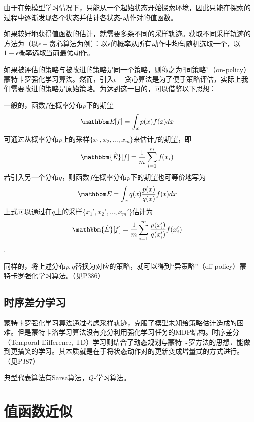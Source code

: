 由于在免模型学习情况下，只能从一个起始状态开始探索环境，因此只能在探索的过程中逐渐发现各个状态并估计各状态-动作对的值函数。

如果较好地获得值函数的估计，就需要多条不同的采样轨迹。获取不同采样轨迹的方法为（以$\epsilon-$贪心算法为例）：以$\epsilon$的概率从所有动作中均匀随机选取一个，以$1-\epsilon$概率选取当前最优动作。

如果被评估的策略与被改进的策略是同一个策略，则称之为``同策略''（on-policy）蒙特卡罗强化学习算法。然而，引入$\epsilon-$贪心算法是为了便于策略评估，实际上我们需要改进的策略是原始策略。为达到这一目的，可以借鉴以下思想：

一般的，函数$f$在概率分布$p$下的期望
\begin{equation}
\mathbbm E[f]=\int_xp(x)f(x)dx
\end{equation}
可通过从概率分布$p$上的采样$\{x_1,x_2,\dots,x_m\}$来估计$f$的期望，即
\begin{equation}
\mathbbm {\hat E}[f]=\frac{1}{m}\sum_{i=1}^mf(x_i)
\end{equation}
若引入另一个分布$q$，则函数$f$在概率分布$p$下的期望也可等价地写为
\begin{equation}
\mathbbm E=\int_x q(x)\frac{p(x)}{q(x)}f(x)dx
\end{equation}
上式可以通过在$q$上的采样$\{x_1',x_2',\dots,x_m'\}$估计为
\begin{equation}
\mathbbm {\hat E}[f]=\frac{1}{m}\sum_{i=1}^m\frac{p(x_i')}{q(x_i')}f(x_i')
\end{equation}
.

同样的，将上述分布$p,q$替换为对应的策略，就可以得到``异策略''（off-policy）蒙特卡罗强化学习算法。（见P386）

\subsection{时序差分学习}

蒙特卡罗强化学习算法通过考虑采样轨迹，克服了模型未知给策略估计造成的困难。但是蒙特卡洛学习算法没有充分利用强化学习任务的MDP结构。时序差分（Temporal Difference, TD）学习则结合了动态规划与蒙特卡罗方法的思想，能做到更搞笑的学习。其本质就是在于将状态动作对的更新变成增量式的方式进行。（见P387）

典型代表算法有Sarsa算法，$Q$-学习算法。

\section{值函数近似}

